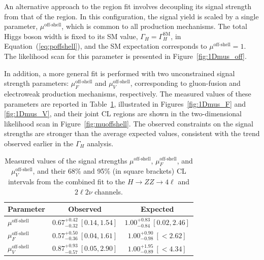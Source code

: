 An alternative approach to the \offshell region fit involves decoupling its signal strength from that of the \onshell region. In this configuration, the signal yield is scaled by a single parameter, $\mu^\text{off-shell}$, which is common to all production mechanisms. The total Higgs boson width is fixed to its SM value, $\Gamma_H = \Gamma_H^{\mathrm{SM}}$, in Equation~(\ref{eq:poffshell}), and the SM expectation corresponds to $\mu^\text{off-shell} = 1$. The likelihood scan for this parameter is presented in Figure~\ref{fig:1Dmus_off}.

In addition, a more general fit is performed with two unconstrained signal strength parameters: $\mu^\text{off-shell}_{F}$ and $\mu^\text{off-shell}_{V}$, corresponding to gluon-fusion and electroweak production mechanisms, respectively. The measured values of these parameters are reported in Table~\ref{table:muoffshell}, illustrated in Figures~\ref{fig:1Dmus_F} and \ref{fig:1Dmus_V}, and their joint CL regions are shown in the two-dimensional likelihood scan in Figure~\ref{fig:muoffshell}. The observed constraints on the \offshell signal strengths are stronger than the average expected values, consistent with the trend observed earlier in the $\Gamma_H$ analysis.

\begin{table}[!hbt]
\centering
\begin{tabular}{lcc}
  Parameter                & {Observed}          &  {Expected}   \\
  \hline
  $\mu^\text{off-shell}$ &  $0.67^{+ 0.42}_{-0.32 }\ [0.14,1.54]$ & $1.00^{+ 0.83}_{-0.84}\ [0.02,2.46]$ \\
  $\mu_F^\text{off-shell}$ &  $0.57^{+ 0.50}_{- 0.36}\ [0.04,1.61]$ & $1.00^{+0.90}_{-0.98}\ [{<}2.62]$\\
  $\mu_V^\text{off-shell}$ &  $ 0.87^{+0.93}_{-0.57}\ [0.05,2.90]$ & $1.00^{+1.95}_{-0.89}\ [{<}4.34]$ \\
\end{tabular}
\caption{
  Measured values of the signal strengths $\mu^\text{off-shell}$, $\mu_F^\text{off-shell}$, and $\mu_V^\text{off-shell}$,
  and their 68\% and 95\% (in square brackets) CL intervals from the combined fit to the \offshell $H\to ZZ\to4\ell$ and $2\ell2\nu$ channels.
}
\label{table:muoffshell}
\end{table}

